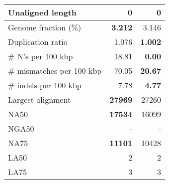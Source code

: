 \documentclass[12pt,a4paper]{article}
\begin{document}
\begin{table}[ht]
\begin{center}
\begin{tabular}{|l*{2}{|r}|}
Unaligned length & 0 & 0 \\ \hline
Genome fraction (\%) & {\bf 3.212} & 3.146 \\ \hline
Duplication ratio & 1.076 & {\bf 1.002} \\ \hline
\# N's per 100 kbp & 18.81 & {\bf 0.00} \\ \hline
\# mismatches per 100 kbp & 70.05 & {\bf 20.67} \\ \hline
\# indels per 100 kbp & 7.78 & {\bf 4.77} \\ \hline
Largest alignment & {\bf 27969} & 27260 \\ \hline
NA50 & {\bf 17534} & 16099 \\ \hline
NGA50 & - & - \\ \hline
NA75 & {\bf 11101} & 10428 \\ \hline
LA50 & 2 & 2 \\ \hline
LA75 & 3 & 3 \\ \hline
\end{tabular}
\end{center}
\end{table}
\end{document}
